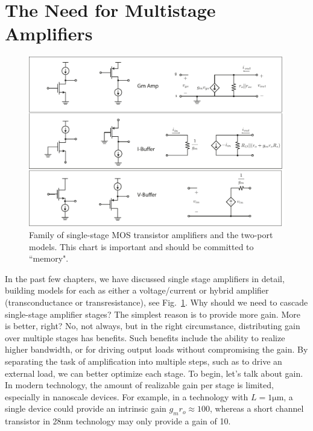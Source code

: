 \section{The Need for Multistage Amplifiers}
\begin{figure}[tb]
\begin{center}
\includegraphics[width=\columnwidth]{ampchart_models}
\end{center}
\caption{Family of single-stage MOS transistor amplifiers and the two-port models.  This chart is important and should be committed to ``memory".}
\label{fig:ampchart_models}
\end{figure}
In the past few chapters, we have discussed single stage amplifiers in detail, building models for each as either a voltage/current or hybrid amplifier (transconductance or transresistance), see Fig.~\ref{fig:ampchart_models}.  Why should we need to cascade single-stage amplifier stages?  The simplest reason is to provide more gain.   More is better, right? No, not always, but in the right circumstance, distributing gain over multiple stages has benefits. Such benefits include the ability to realize higher bandwidth, or for driving output loads without compromising the gain.  By separating the task of amplification into multiple steps, such as to drive an external load, we can better optimize each stage.
To begin, let's talk about gain.  In modern technology, the amount of realizable gain per stage is  limited, especially in nanoscale devices.  For example, in a technology with $L = 1\mathrm{\mu m}$, a single device could provide an intrinsic gain $g_m r_o \approx 100$, whereas a short channel transistor in 28nm technology may only provide a gain of 10.  
